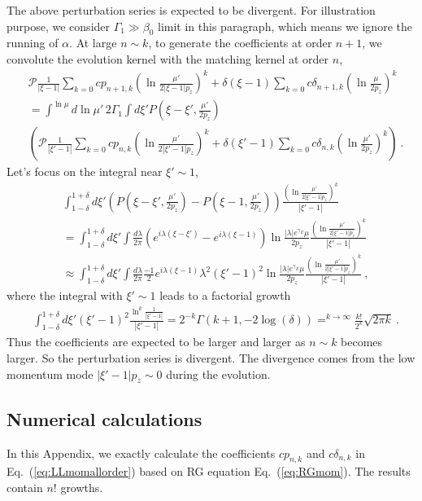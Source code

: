 \documentclass[a4paper,11pt]{article}
\begin{document}
The above perturbation series is expected to be divergent. For illustration purpose, we consider $\Gamma_1 \gg \beta_0$ limit in this paragraph, which means we ignore the running of $\alpha$. At large $n \sim k$, to generate the coefficients at order $n+1$, we convolute the evolution kernel with the matching kernel at order $n$,
\begin{align}
&\mathcal{P}\frac{1}{|\xi-1|}\sum_{k=0} cp_{n+1,k} \left(\ln \frac{\mu'}{2|\xi-1|p_z}\right)^k + \delta(\xi-1)\sum_{k=0} c\delta_{n+1,k} \left(\ln \frac{\mu}{2p_z}\right)^k
\nonumber\\
&=\int^{\ln \mu} d \ln \mu' \, 2 \Gamma_{1} \int d\xi' P\left(\xi-\xi',\frac{\mu'}{2 p_z}\right) \nonumber\\
&\left(\mathcal{P}\frac{1}{|\xi'-1|}\sum_{k=0} cp_{n,k} \left(\ln \frac{\mu'}{2|\xi'-1|p_z}\right)^k + \delta(\xi'-1)\sum_{k=0} c\delta_{n,k} \left(\ln \frac{\mu'}{2p_z}\right)^k
\right) \ .
\end{align}
Let's focus on the integral near $\xi' \sim 1$,
\begin{align}
&\int_{1-\delta}^{1+\delta} d\xi' \left(P\left(\xi-\xi',\frac{\mu'}{2 p_z}\right)-P\left(\xi-1,\frac{\mu'}{2 p_z}\right)\right) \frac{\left(\ln \frac{\mu'}{2|\xi'-1|p_z}\right)^k}{|\xi'-1|} \nonumber\\
&=\int_{1-\delta}^{1+\delta} d\xi' \int \frac{d \lambda}{2\pi} \left(e^{i \lambda (\xi-\xi')}-e^{i \lambda (\xi-1)}\right)\ln \frac{|\lambda|e^{\gamma_{E}}\mu}{2p_z}\frac{\left(\ln \frac{\mu'}{2|\xi'-1|p_z}\right)^k}{|\xi'-1|} \nonumber\\
&\approx\int_{1-\delta}^{1+\delta} d\xi' \int \frac{d \lambda}{2\pi} \frac{-1}{2} e^{i \lambda (\xi-1)} \lambda^2 (\xi'-1)^2\ln \frac{|\lambda|e^{\gamma_{E}}\mu}{2p_z}\frac{\left(\ln \frac{\mu'}{2|\xi'-1|p_z}\right)^k}{|\xi'-1|} \ ,
\end{align}
where the integral with $\xi' \sim 1$ leads to a factorial growth
\begin{align}
&\int_{1-\delta}^{1+\delta} d\xi' (\xi'-1)^2 \frac{\ln^{k} \frac{1}{|\xi'-1|} }{|\xi'-1|} = 2^{-k} \Gamma (k+1,-2 \log (\delta ))=^{k \rightarrow \infty} \frac{k!}{2^{k}} \sqrt{2 \pi k} \ .
\end{align}
Thus the coefficients are expected to be larger and larger as $n \sim k$ becomes larger. So the perturbation series is divergent. The divergence comes from the low momentum mode $|\xi'-1|p_z \sim 0$ during the evolution. 

\subsection{Numerical calculations}
In this Appendix, we exactly calculate the coefficients $cp_{n,k}$ and $c\delta_{n,k}$ in Eq.~(\ref{eq:LLmomallorder}) based on RG equation Eq.~(\ref{eq:RGmom}). The results contain $n!$ growths. 
\end{document}
